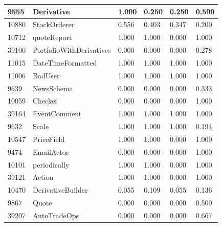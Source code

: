 \documentclass[a4paper]{article}
\newlength{\DUtablewidth} %
\begin{document}
\begin{longtable*}[c]{|p{0.160\DUtablewidth}|p{0.160\DUtablewidth}|p{0.160\DUtablewidth}|p{0.160\DUtablewidth}|p{0.160\DUtablewidth}|p{0.160\DUtablewidth}|}
9555
 & 
Derivative
 & 
1.000
 & 
0.250
 & 
0.250
 & 
0.500
 \\
\hline

10880
 & 
StockOrderer
 & 
0.556
 & 
0.403
 & 
0.347
 & 
0.200
 \\
\hline

10712
 & 
quoteReport
 & 
1.000
 & 
1.000
 & 
0.000
 & 
1.000
 \\
\hline

39100
 & 
PortfolioWithDerivatives
 & 
0.000
 & 
0.000
 & 
0.000
 & 
0.278
 \\
\hline

11015
 & 
DateTimeFormatted
 & 
1.000
 & 
1.000
 & 
1.000
 & 
1.000
 \\
\hline

11006
 & 
BadUser
 & 
1.000
 & 
1.000
 & 
1.000
 & 
1.000
 \\
\hline

9639
 & 
NewsSchema
 & 
0.000
 & 
0.000
 & 
0.000
 & 
0.333
 \\
\hline

10059
 & 
Checker
 & 
0.000
 & 
0.000
 & 
0.000
 & 
1.000
 \\
\hline

39164
 & 
EventComment
 & 
1.000
 & 
1.000
 & 
1.000
 & 
1.000
 \\
\hline

9632
 & 
Scale
 & 
1.000
 & 
1.000
 & 
1.000
 & 
0.194
 \\
\hline

10547
 & 
PriceField
 & 
1.000
 & 
1.000
 & 
0.000
 & 
1.000
 \\
\hline

9474
 & 
EmailActor
 & 
0.000
 & 
0.000
 & 
0.000
 & 
1.000
 \\
\hline

10101
 & 
periodically
 & 
1.000
 & 
1.000
 & 
0.000
 & 
1.000
 \\
\hline

39121
 & 
Action
 & 
1.000
 & 
1.000
 & 
0.000
 & 
1.000
 \\
\hline

10470
 & 
DerivativeBuilder
 & 
0.055
 & 
0.109
 & 
0.055
 & 
0.136
 \\
\hline

9867
 & 
Quote
 & 
0.000
 & 
0.000
 & 
0.000
 & 
0.500
 \\
\hline

39207
 & 
AutoTradeOps
 & 
0.000
 & 
0.000
 & 
0.000
 & 
0.667
 \\
\hline


\end{longtable*}
\end{document}
